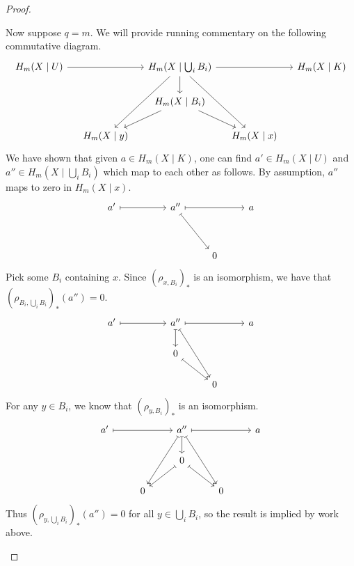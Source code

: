 \documentclass[main.tex]{subfiles}
\begin{document}
\begin{proof}
\begin{enumerate}
      Now suppose \(q = m\). We will provide running commentary on the following commutative diagram.
      \begin{equation*}
        \begin{tikzcd}[column sep=small]
          H_{m}(X \mid U)
          \arrow[rr]
          && H_{m}(X \mid \bigcup_{i} B_{i})
          \arrow[rr]
          \arrow[d]
          \arrow[ddl]
          \arrow[ddr]
          && H_{m}(X \mid K)
          \\
          && H_{m}(X \mid B_{i})
          \arrow[dl]
          \arrow[dr]
          \\
          & H_{m}(X \mid y)
          && H_{m}(X \mid x)
        \end{tikzcd}
      \end{equation*}
      We have shown that given \(a \in H_{m}(X \mid K)\), one can find \(a' \in H_{m}(X \mid U)\) and \(a'' \in H_{m}(X \mid \bigcup_{i} B_{i})\) which map to each other as follows. By assumption, \(a''\) maps to zero in \(H_{m}(X \mid x)\).
      \begin{equation*}
        \begin{tikzcd}
          a'
          \arrow[rr, mapsto]
          && a''
          \arrow[rr, mapsto]
          \arrow[ddr, mapsto]
          && a
          \\
          \\
          &&& 0
        \end{tikzcd}
      \end{equation*}
      Pick some \(B_{i}\) containing \(x\). Since \((\rho_{x, B_{i}})_{*}\) is an isomorphism, we have that \((\rho_{B_{i}, \bigcup_{i} B_{i}})_{*}(a'') = 0\).
      \begin{equation*}
        \begin{tikzcd}
          a'
          \arrow[rr, mapsto]
          && a''
          \arrow[rr, mapsto]
          \arrow[ddr, mapsto]
          \arrow[d, mapsto]
          && a
          \\
          && 0
          \arrow[dr, mapsto]
          \\
          &&& 0
        \end{tikzcd}
      \end{equation*}
      For any \(y \in B_{i}\), we know that \((\rho_{y, B_{i}})_{*}\) is an isomorphism.
      \begin{equation*}
        \begin{tikzcd}
          a'
          \arrow[rr, mapsto]
          && a''
          \arrow[rr, mapsto]
          \arrow[ddr, mapsto]
          \arrow[d, mapsto]
          \arrow[ddl, mapsto]
          && a
          \\
          && 0
          \arrow[dr, mapsto]
          \arrow[dl, mapsto]
          \\
          & 0
          && 0
        \end{tikzcd}
      \end{equation*}
      Thus \((\rho_{y, \bigcup_{i}B_{i}})_{*}(a'') = 0\) for all \(y \in \bigcup_{i} B_{i}\), so the result is implied by work above.


\end{enumerate}
\end{proof}
\end{document}
